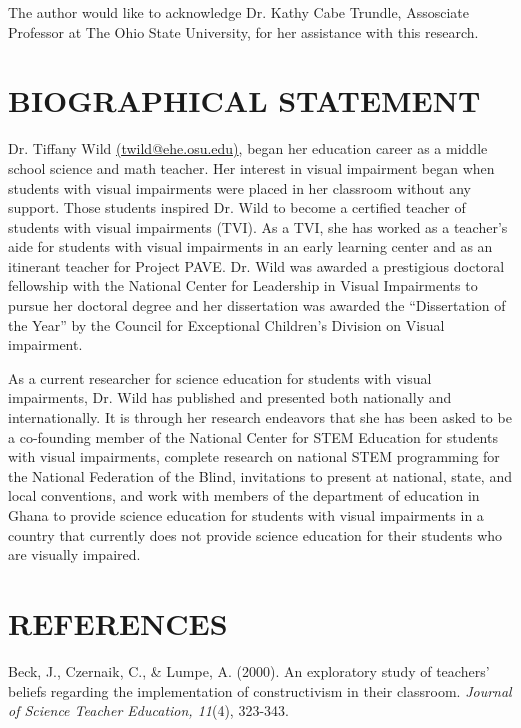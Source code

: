 \documentclass[11.5pt]{sig-alternate} %
\begin{document}
\begin{large}
The author would like to acknowledge Dr. Kathy Cabe Trundle, Assosciate Professor at The Ohio State University, for her assistance with this research.

\section*{BIOGRAPHICAL STATEMENT}

Dr. Tiffany Wild \href{mailto:twild@ehe.osu.edu}{(twild@ehe.osu.edu)}, began her education career as a middle school science and math teacher. Her interest in visual impairment began when students with visual impairments were placed in her classroom without any support. Those students inspired Dr. Wild to become a certified teacher of students with visual impairments (TVI). As a TVI, she has worked as a teacher’s aide for students with visual impairments in an early learning center and as an itinerant teacher for Project PAVE. Dr. Wild was awarded a prestigious doctoral fellowship with the National Center for Leadership in Visual Impairments to pursue her doctoral degree and her dissertation was awarded the “Dissertation of the Year” by the Council for Exceptional Children’s Division on Visual impairment.

As a current researcher for science education for students with visual impairments, Dr. Wild has published and presented both nationally and internationally. It is through her research endeavors that she has been asked to be a co-founding member of the National Center for STEM Education for students with visual impairments, complete research on national STEM programming for the National Federation of the Blind, invitations to present at national, state, and local conventions, and work with members of the department of education in Ghana to provide science education for students with visual impairments in a country that currently does not
provide science education for their students who are visually impaired.

\end{large}
\clearpage
\section*{REFERENCES}\par 

\leftskip 0.25in
\parindent -0.25in 

Beck, J., Czernaik, C., \& Lumpe, A.  (2000).  An exploratory study of teachers’ beliefs regarding the implementation of constructivism in their classroom.  \textit{Journal of Science Teacher Education, 11}(4), 323-343.
\end{document}
